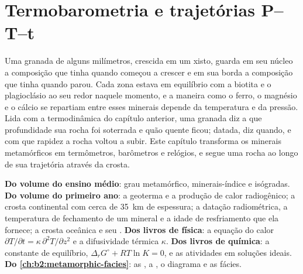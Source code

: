 \chapter{Termobarometria e trajetórias P--T--t}\label{ch:b2:pt-paths}

Uma granada de alguns milímetros, crescida em um xisto, guarda em seu núcleo a composição
que tinha quando começou a crescer e em sua borda a composição que tinha quando parou. Cada
zona estava em equilíbrio com a biotita e o plagioclásio ao seu redor naquele momento, e a
maneira como o ferro, o magnésio e o cálcio se repartiam entre esses minerais depende da temperatura
e da pressão. Lida com a termodinâmica do capítulo anterior, uma granada diz a que
profundidade sua rocha foi soterrada e quão quente ficou; datada, diz quando, e com que rapidez a
rocha voltou a subir. Este capítulo transforma os minerais metamórficos em termômetros, barômetros
e relógios, e segue uma rocha ao longo de sua trajetória através da crosta.

\begin{recall}
\textbf{Do volume do ensino médio}: grau metamórfico, minerais-índice e isógradas.
\textbf{Do volume do primeiro ano}: a geoterma e a produção de calor radiogênico; a
crosta continental com cerca de \qty{35}{km} de espessura; a datação radiométrica, a temperatura de fechamento
de um mineral e a idade de resfriamento que ela fornece; a crosta oceânica e seu .
\textbf{Dos livros de física}: a equação do calor $\partial T/\partial t = \kappa\,
\partial^2 T/\partial z^2$ e a difusividade térmica $\kappa$. \textbf{Dos livros de
química}: a constante de equilíbrio, $\Delta_r G^\circ + RT\ln K = 0$, e as atividades em
soluções ideais. \textbf{Do \cref{ch:b2:metamorphic-facies}}: as ,
a , o diagrama  e as fácies.
\end{recall}

